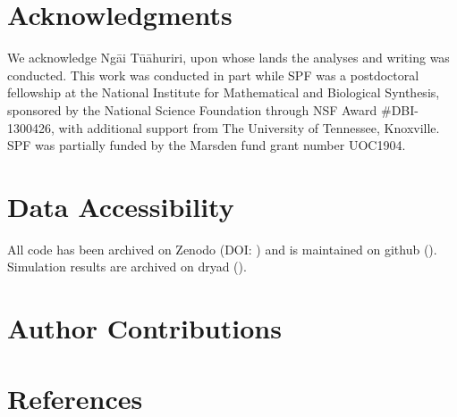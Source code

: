 \documentclass[11pt,]{article}
\begin{document}
\hypertarget{acknowledgments}{%
\section{Acknowledgments}\label{acknowledgments}}

We acknowledge Ngāi Tūāhuriri, upon whose lands the analyses and writing
was conducted. This work was conducted in part while SPF was a
postdoctoral fellowship at the National Institute for Mathematical and
Biological Synthesis, sponsored by the National Science Foundation
through NSF Award \#DBI-1300426, with additional support from The
University of Tennessee, Knoxville.
SPF was partially funded by the Marsden fund grant number UOC1904.

\hypertarget{data-accessibility}{%
\section{Data Accessibility}\label{data-accessibility}}

All code has been archived on Zenodo (DOI: ) and is maintained on github
(). Simulation results are archived on dryad ().

\hypertarget{author-contributions}{%
\section{Author Contributions}\label{author-contributions}}

\hypertarget{references}{%
\section{References}\label{references}}
\end{document}
